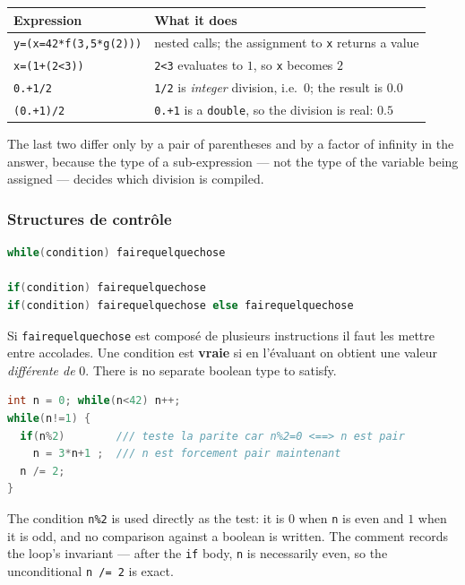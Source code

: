 \begin{example}
  \begin{center}
  \begin{tabular}{ll}
    \toprule
    Expression & What it does \\
    \midrule
    \verb|y=(x=42*f(3,5*g(2)))| & nested calls; the assignment to \verb|x| returns a value \\
    \verb|x=(1+(2<3))| & \verb|2<3| evaluates to $1$, so \verb|x| becomes $2$ \\
    \verb|0.+1/2| & \verb|1/2| is \textit{integer} division, i.e.\ $0$; the result is $0.0$ \\
    \verb|(0.+1)/2| & \verb|0.+1| is a \verb|double|, so the division is real: $0.5$ \\
    \bottomrule
  \end{tabular}
  \end{center}
  The last two differ only by a pair of parentheses and by a factor of
  infinity in the answer, because the type of a sub-expression --- not the type
  of the variable being assigned --- decides which division is compiled.
\end{example}

\subsubsection{Structures de contrôle}
\begin{lstlisting}[language=C]
while(condition) fairequelquechose

if(condition) fairequelquechose
if(condition) fairequelquechose else fairequelquechose
\end{lstlisting}
Si \verb|fairequelquechose| est composé de plusieurs instructions il faut les
mettre entre accolades. Une condition est \textbf{vraie} si en l'évaluant on
obtient une valeur \textit{différente de} $0$. There is no separate boolean
type to satisfy.

\begin{example}[Collatz]
  \begin{lstlisting}[language=C]
int n = 0; while(n<42) n++;
while(n!=1) {
  if(n%2)        /// teste la parite car n%2=0 <==> n est pair
    n = 3*n+1 ;  /// n est forcement pair maintenant
  n /= 2;
}
  \end{lstlisting}
  The condition \verb|n%2| is used directly as the test: it is $0$ when
  \verb|n| is even and $1$ when it is odd, and no comparison against a boolean
  is written. The comment records the loop's invariant --- after the
  \verb|if| body, \verb|n| is necessarily even, so the unconditional
  \verb|n /= 2| is exact.
\end{example}

